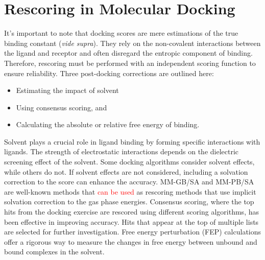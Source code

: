 \chapter*{Rescoring in Molecular Docking}
It's important to note that docking scores are mere estimations of the true binding constant (\textit{vide supra}). They rely on the non-covalent interactions between the ligand and receptor and often disregard the entropic component of binding. Therefore, rescoring must be performed with an independent scoring function to ensure reliability.
    Three post-docking corrections are outlined here:
    \begin{itemize}
        \item Estimating the impact of solvent
        \item Using consensus scoring, and 
        \item Calculating the absolute or relative free energy of binding.
    \end{itemize}
Solvent plays a crucial role in ligand binding by forming specific interactions with ligands. The strength of electrostatic interactions depends on the dielectric screening effect of the solvent. Some docking algorithms consider solvent effects, while others do not. If solvent effects are not considered, including a solvation correction to the score can enhance the accuracy. MM-GB/SA and MM-PB/SA are well-known methods that \textcolor{red}{can be used} as rescoring methods that use implicit solvation correction to the gas phase energies\cite{bib13}. Consensus scoring, where the top hits from the docking exercise are rescored using different scoring algorithms, has been effective in improving accuracy. Hits that appear at the top of multiple lists are selected for further investigation. Free energy perturbation (FEP) calculations offer a rigorous way to measure the changes in free energy between unbound and bound complexes in the solvent.
